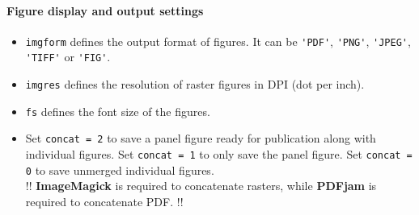 \documentclass[twoside,a4paper]{article}
\def\ImageMagick{\textbf{ImageMagick}}
\def\PDFjam{\textbf{PDFjam}}
\begin{document}
\paragraph{Figure display and output settings}
\begin{itemize}[leftmargin=*]
\setlength\itemsep{2ex}
\item \verb|imgform| defines the output format of figures. It can be \verb|'PDF'|, \verb|'PNG'|, \verb|'JPEG'|, \verb|'TIFF'| or \verb|'FIG'|.

\item \verb|imgres| defines the resolution of raster figures in DPI (dot per inch).

\item \verb|fs| defines the font size of the figures.

\item Set \verb|concat = 2| to save a panel figure ready for publication along with individual figures. Set \verb|concat = 1| to only save the panel figure. Set \verb|concat = 0| to save unmerged individual figures.\\[1ex]
!! {\ImageMagick} is required to concatenate rasters, while {\PDFjam} is required to concatenate PDF. !!
\end{itemize}
\end{document}
